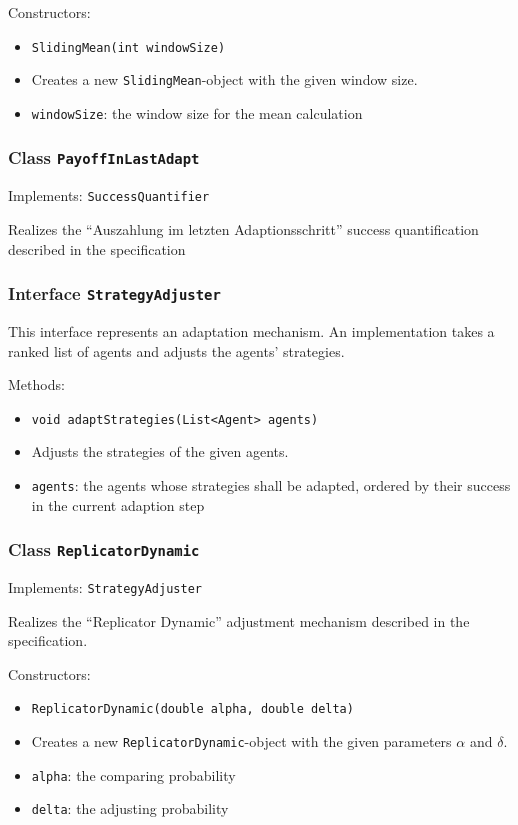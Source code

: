 \documentclass[parskip=full,11pt]{scrartcl}
\begin{document}
Constructors:
\begin{itemize}\itemsep -10pt
\item \texttt{SlidingMean(int windowSize)}
\item[] Creates a new \texttt{SlidingMean}-object with the given window size.
\item[] \texttt{windowSize}: the window size for the mean calculation
\end{itemize}

\subsubsection{Class \texttt{PayoffInLastAdapt}}
Implements: \texttt{SuccessQuantifier}

Realizes the \enquote{Auszahlung im letzten Adaptionsschritt} success quantification described in the specification

\subsubsection{Interface \texttt{StrategyAdjuster}}
This interface represents an adaptation mechanism. An implementation takes a ranked list of agents and adjusts the agents' strategies.

Methods:
\begin{itemize}\itemsep -10pt
\item \texttt{void adaptStrategies(List<Agent> agents)}
\item[] Adjusts the strategies of the given agents.
\item[] \texttt{agents}: the agents whose strategies shall be adapted, ordered by their success in the current adaption step
\end{itemize}

\subsubsection{Class \texttt{ReplicatorDynamic}}
Implements: \texttt{StrategyAdjuster}

Realizes the \enquote{Replicator Dynamic} adjustment mechanism described in the specification.

Constructors:
\begin{itemize}\itemsep -10pt
\item \texttt{ReplicatorDynamic(double alpha, double delta)}
\item[] Creates a new \texttt{ReplicatorDynamic}-object with the given parameters \(\alpha\) and \(\delta\).
\item[] \texttt{alpha}: the comparing probability
\item[] \texttt{delta}: the adjusting probability
\end{itemize}
\end{document}
